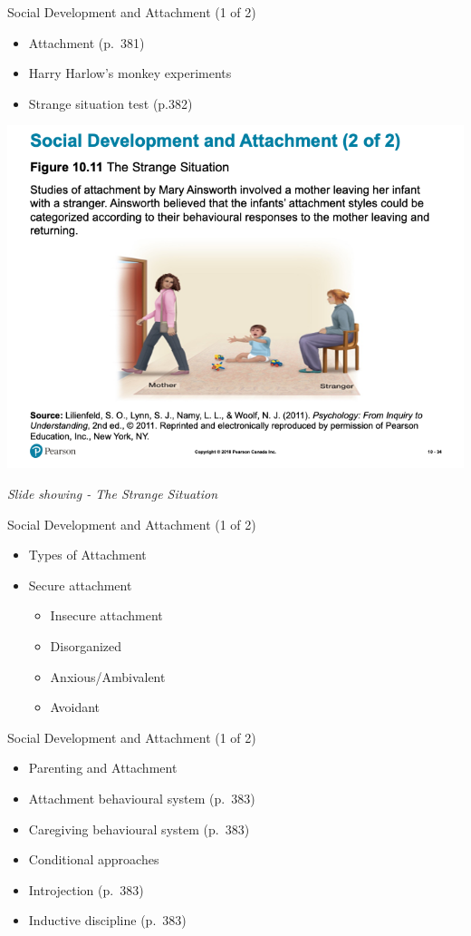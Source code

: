 \documentclass[
]{book}
\providecommand{\tightlist}{%
  \setlength{\itemsep}{0pt}\setlength{\parskip}{0pt}}
\begin{document}
Social Development and Attachment (1 of 2)

\begin{itemize}
\tightlist
\item
  Attachment (p.~381)
\item
  Harry Harlow's monkey experiments
\item
  Strange situation test (p.382)
\end{itemize}

\includegraphics{assets/unit_3/slide_34.png}

\emph{Slide showing - The Strange Situation}

Social Development and Attachment (1 of 2)

\begin{itemize}
\tightlist
\item
  Types of Attachment
\item
  Secure attachment

  \begin{itemize}
  \tightlist
  \item
    Insecure attachment
  \item
    Disorganized
  \item
    Anxious/Ambivalent
  \item
    Avoidant
  \end{itemize}
\end{itemize}

Social Development and Attachment (1 of 2)

\begin{itemize}
\tightlist
\item
  Parenting and Attachment
\item
  Attachment behavioural system (p.~383)
\item
  Caregiving behavioural system (p.~383)
\item
  Conditional approaches
\item
  Introjection (p.~383)
\item
  Inductive discipline (p.~383)
\end{itemize}
\end{document}
